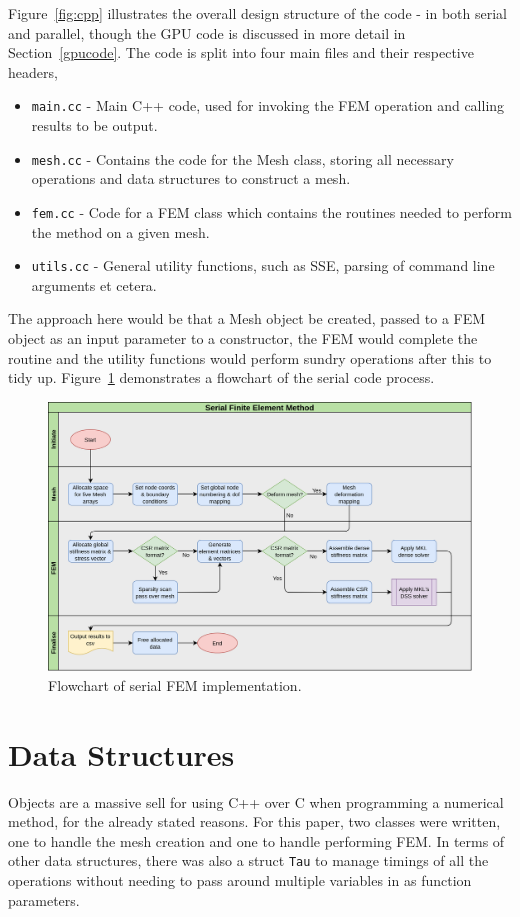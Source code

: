 Figure~\ref{fig:cpp} illustrates the overall design structure of the code - in both serial and parallel, though the GPU code is discussed in more detail in Section~\ref{gpucode}. The code is split into four main files and their respective headers,
\begin{itemize}
	\item \texttt{main.cc} - Main C++ code, used for invoking the FEM operation and calling results to be output.
	\item \texttt{mesh.cc} - Contains the code for the Mesh class, storing all necessary operations and data structures to construct a mesh.
	\item \texttt{fem.cc} - Code for a FEM class which contains the routines needed to perform the method on a given mesh.
	\item \texttt{utils.cc} - General utility functions, such as SSE, parsing of command line arguments et cetera.
\end{itemize}
The approach here would be that a Mesh object be created, passed to a FEM object as an input parameter to a constructor, the FEM would complete the routine and the utility functions would perform sundry operations after this to tidy up. Figure~\ref{fig:serial_flow} demonstrates a flowchart of the serial code process.
\begin{figure}
	\centering
	\includegraphics[width = 0.9\linewidth]{Figures/serial_flowchart}
	\caption{Flowchart of serial FEM implementation.}
	\label{fig:serial_flow}
\end{figure}

\section{Data Structures}

Objects are a massive sell for using C++ over C when programming a numerical method, for the already stated reasons. For this paper, two classes were written, one to handle the mesh creation and one to handle performing FEM. In terms of other data structures, there was also a struct \texttt{Tau} to manage timings of all the operations without needing to pass around multiple variables in as function parameters.

